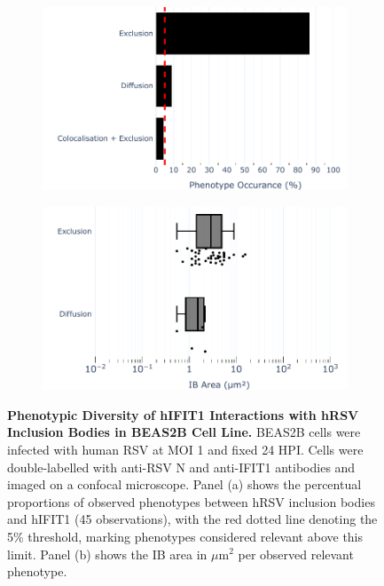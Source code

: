 \begin{figure}
    \begin{subfigure}{0.495\textwidth}
        \caption{}
        \includegraphics[width=1\linewidth]{08. Chapter 3/Figs/02. Infection/01. IFIT1/04. bar_i1_beas2b.pdf} 
    \end{subfigure}
    \begin{subfigure}{0.495\textwidth}
        \caption{}
        \includegraphics[width=1\linewidth]{08. Chapter 3/Figs/02. Infection/01. IFIT1/05. box_i1_beas2b.pdf}
    \end{subfigure}
    \caption[Phenotypic Diversity of hIFIT1 Interactions with hRSV Inclusion Bodies in BEAS2B Cell Line.]{\textbf{Phenotypic Diversity of hIFIT1 Interactions with hRSV Inclusion Bodies in BEAS2B Cell Line.} BEAS2B cells were infected with human RSV at MOI 1 and fixed 24 HPI. Cells were double-labelled with anti-RSV N and anti-IFIT1 antibodies and imaged on a confocal microscope. Panel (a) shows the percentual proportions of observed phenotypes between hRSV inclusion bodies and hIFIT1 (45 observations), with the red dotted line denoting the 5\% threshold, marking phenotypes considered relevant above this limit. Panel (b) shows the IB area in \(\mu \mbox{m}^2\) per observed relevant phenotype.}
    \label{fig:Phenotypic Diversity of hIFIT1 Interactions with hRSV Inclusion Bodies in BEAS2B Cell Line}
\end{figure}

